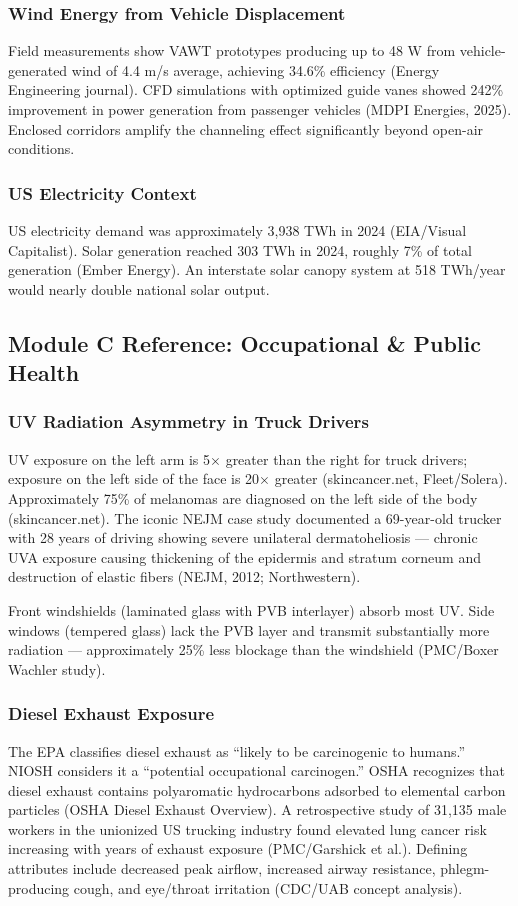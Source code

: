 \documentclass[11pt,letterpaper]{article}
\begin{document}
\subsubsection{Wind Energy from Vehicle Displacement}
Field measurements show VAWT prototypes producing up to 48 W from vehicle-generated wind of 4.4 m/s average, achieving 34.6\% efficiency (Energy Engineering journal). CFD simulations with optimized guide vanes showed 242\% improvement in power generation from passenger vehicles (MDPI Energies, 2025). Enclosed corridors amplify the channeling effect significantly beyond open-air conditions.

\subsubsection{US Electricity Context}
US electricity demand was approximately 3,938 TWh in 2024 (EIA/Visual Capitalist). Solar generation reached 303 TWh in 2024, roughly 7\% of total generation (Ember Energy). An interstate solar canopy system at 518 TWh/year would nearly double national solar output.

\subsection{Module C Reference: Occupational \& Public Health}

\subsubsection{UV Radiation Asymmetry in Truck Drivers}
UV exposure on the left arm is 5$\times$ greater than the right for truck drivers; exposure on the left side of the face is 20$\times$ greater (skincancer.net, Fleet/Solera). Approximately 75\% of melanomas are diagnosed on the left side of the body (skincancer.net). The iconic NEJM case study documented a 69-year-old trucker with 28 years of driving showing severe unilateral dermatoheliosis --- chronic UVA exposure causing thickening of the epidermis and stratum corneum and destruction of elastic fibers (NEJM, 2012; Northwestern).

Front windshields (laminated glass with PVB interlayer) absorb most UV. Side windows (tempered glass) lack the PVB layer and transmit substantially more radiation --- approximately 25\% less blockage than the windshield (PMC/Boxer Wachler study).

\subsubsection{Diesel Exhaust Exposure}
The EPA classifies diesel exhaust as ``likely to be carcinogenic to humans.'' NIOSH considers it a ``potential occupational carcinogen.'' OSHA recognizes that diesel exhaust contains polyaromatic hydrocarbons adsorbed to elemental carbon particles (OSHA Diesel Exhaust Overview). A retrospective study of 31,135 male workers in the unionized US trucking industry found elevated lung cancer risk increasing with years of exhaust exposure (PMC/Garshick et al.). Defining attributes include decreased peak airflow, increased airway resistance, phlegm-producing cough, and eye/throat irritation (CDC/UAB concept analysis).
\end{document}
